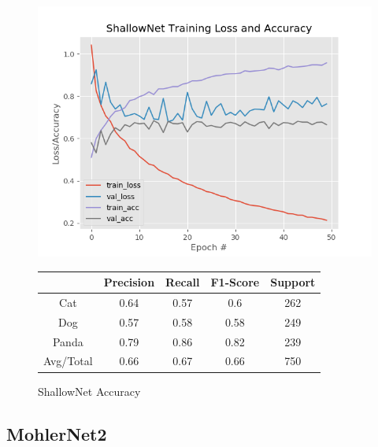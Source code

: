 \documentclass[12pt]{article}
\begin{document}
\begin{figure}[h]
	\centering %
	\captionsetup{justification=centering}
	\begin{minipage}{0.5\textwidth}
		\centering %
		\includegraphics[width=1\textwidth]{BaselineResults_ShallowNet_opt-SGD.png}
		\caption{ShallowNet Accuracy} \label{SN}
	\end{minipage}\hfill
	\begin{minipage}{0.5\textwidth}
		\begin{center}
			\begin{tabular}[5pt]{| c| c| c| c|c|}
				\hline
				& Precision & Recall & F1-Score & Support \\[0.5ex] 
				\hline 	
				Cat   &    0.64	&0.57&	0.6&	262\\ \hline 
				Dog    &   0.57&	0.58&	0.58&	249\\ \hline 
				Panda   &   0.79&	0.86&	0.82&	239	\\ \hline 
				Avg/Total  &     0.66 &	0.67 &	0.66 &	750\\ \hline 
				
			\end{tabular}
			\label{SNR}
		\end{center}	
	\end{minipage}
\end{figure}

\subsection{MohlerNet2}
\end{document}

